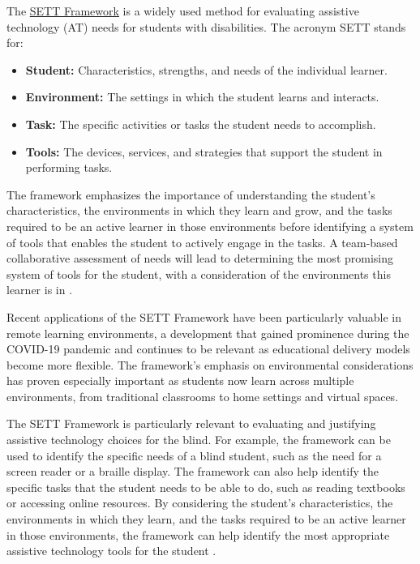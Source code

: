 The \href{https://www.joyzabala.com/links-resources}{SETT Framework} \supercite{ZabalaSETT, MNSETT} is a widely used method for evaluating assistive technology (AT) needs for students with disabilities. The acronym SETT stands for:

\begin{itemize}
	\item \textbf{Student:} Characteristics, strengths, and needs of the individual learner.
	\item \textbf{Environment:} The settings in which the student learns and interacts.
	\item \textbf{Task:} The specific activities or tasks the student needs to accomplish.
	\item \textbf{Tools:} The devices, services, and strategies that support the student in performing tasks.
\end{itemize}

The framework emphasizes the importance of understanding the student's characteristics, the environments in which they learn and grow, and the tasks required to be an active learner in those environments before identifying a system of tools that enables the student to actively engage in the tasks. A team-based collaborative assessment of needs will lead to determining the most promising system of tools for the student, with a consideration of the environments this learner is in \supercite{Hollingshead2020}.

Recent applications of the SETT Framework have been particularly valuable in remote learning environments, a development that gained prominence during the COVID-19 pandemic and continues to be relevant as educational delivery models become more flexible. The framework's emphasis on environmental considerations has proven especially important as students now learn across multiple environments, from traditional classrooms to home settings and virtual spaces.

The SETT Framework is particularly relevant to evaluating and justifying assistive technology choices for the blind. For example, the framework can be used to identify the specific needs of a blind student, such as the need for a screen reader or a braille display. The framework can also help identify the specific tasks that the student needs to be able to do, such as reading textbooks or accessing online resources. By considering the student's characteristics, the environments in which they learn, and the tasks required to be an active learner in those environments, the framework can help identify the most appropriate assistive technology tools for the student \supercite{Zabala2005, Zabala2018}.

